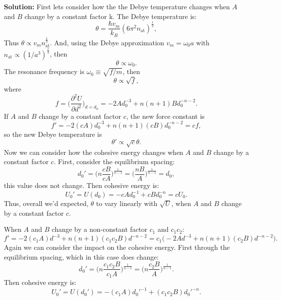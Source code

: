 \documentclass[12pt]{article}
\begin{document}
\textbf{Solution:}
First lets consider how the the Debye temperature changes when $A$ and $B$ change by a constant factor k. The
Debye temperature is:
\begin{equation}
	\theta = \frac{\hbar v_m}{k_B} (6 \pi^2 n_\text{at})^\frac{1}{3},
\end{equation}
Thus $\theta \propto v_m n_\text{at}^\frac{1}{3}$.
And, using the Debye approximation $v_m = \omega_0 a$ with $n_\text{at} \propto (1/a^3)^\frac{1}{3}$, then
\begin{equation}
	\theta \propto \omega_0.
\end{equation}
The resonance frequency is $\omega_0 \equiv \sqrt{f / m}$, then
\begin{equation}
	\theta \propto \sqrt{f},
\end{equation}
where
\begin{equation}
	f = \Big( \frac{ \partial^2 U }{ \partial d^2 } \Big)_{ d = d_0 }
	= -2 A d_0^{-3} + n (n + 1) B d_0^{-n - 2}.
\end{equation}
If $A$ and $B$ change by a constant factor $c$, the new force constant is
\begin{equation}
	f' = -2 (c A)d_0^{-3} + n (n + 1) (c B) d_0^{-n - 2} = c f,
\end{equation}
so the new Debye temperature is
\begin{equation}
	\theta' \propto \sqrt{c} \theta.
\end{equation}
Now we can consider how the cohesive energy changes when $A$ and $B$ change by a constant
factor $c$. First, consider the equilibrium spacing:
\begin{equation}
	d_0' = \bigg( n\frac{c B}{c A} \bigg)^{\frac{1}{n - 1}} = \bigg( \frac{n B}{A} \bigg)^{\frac{1}{n - 1}} = d_0,
\end{equation}
this value does not change. Then cohesive energy is:
\begin{equation}
	U_0' = U(d_0) = - c A d_0^{-1} + c B d_0^{-n} = c U_0.
\end{equation}
Thus, overall we'd expected, $\theta$ to vary linearly with $\sqrt{U}$,
when $A$ and $B$ change by a constant factor $c$.


When $A$ and $B$ change by a non-constant factor $c_1$ and $c_1 c_2$:
\begin{equation}
	f' = -2 (c_1 A) d^{-3} + n(n + 1) (c_1 c_2 B) d^{-n-2} = c_1 \Big( -2 A d^{-3} + n(n+1) (c_2 B) d^{-n-2}\Big).
\end{equation}
Again we can consider the impact on the cohesive energy. First through the equilibrium spacing, which in this
case does change:
\begin{equation}
	d_0' = \bigg( n \frac{c_1 c_2 B}{c_1 A} \bigg)^{\frac{1}{n - 1}} = \bigg( n \frac{c_2 B}{A} \bigg)^{\frac{1}{n - 1}}.
\end{equation}
Then cohesive energy is:
\begin{equation}
	U_0' = U(d_0') = -(c_1 A) d_0'^{-1} + (c_1 c_2 B) d_0'^{-n}.
\end{equation}
\end{document}
